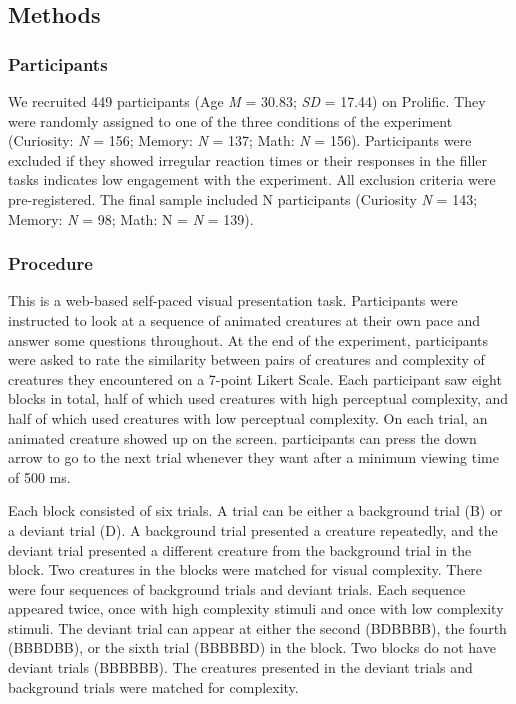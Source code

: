 \documentclass[10pt, letterpaper]{article}
\begin{document}
\hypertarget{methods}{%
\subsection{Methods}\label{methods}}

\hypertarget{participants}{%
\subsubsection{Participants}\label{participants}}

We recruited 449 participants (Age \emph{M} = 30.83; \emph{SD} = 17.44)
on Prolific. They were randomly assigned to one of the three conditions
of the experiment (Curiosity: \emph{N} = 156; Memory: \emph{N} = 137;
Math: \emph{N} = 156). Participants were excluded if they showed
irregular reaction times or their responses in the filler tasks
indicates low engagement with the experiment. All exclusion criteria
were pre-registered. The final sample included N participants (Curiosity
\emph{N} = 143; Memory: \emph{N} = 98; Math: N = \emph{N} = 139).

\hypertarget{procedure}{%
\subsubsection{Procedure}\label{procedure}}

This is a web-based self-paced visual presentation task. Participants
were instructed to look at a sequence of animated creatures at their own
pace and answer some questions throughout. At the end of the experiment,
participants were asked to rate the similarity between pairs of
creatures and complexity of creatures they encountered on a 7-point
Likert Scale. Each participant saw eight blocks in total, half of which
used creatures with high perceptual complexity, and half of which used
creatures with low perceptual complexity. On each trial, an animated
creature showed up on the screen. participants can press the down arrow
to go to the next trial whenever they want after a minimum viewing time
of 500 ms.

Each block consisted of six trials. A trial can be either a background
trial (B) or a deviant trial (D). A background trial presented a
creature repeatedly, and the deviant trial presented a different
creature from the background trial in the block. Two creatures in the
blocks were matched for visual complexity. There were four sequences of
background trials and deviant trials. Each sequence appeared twice, once
with high complexity stimuli and once with low complexity stimuli. The
deviant trial can appear at either the second (BDBBBB), the fourth
(BBBDBB), or the sixth trial (BBBBBD) in the block. Two blocks do not
have deviant trials (BBBBBB). The creatures presented in the deviant
trials and background trials were matched for complexity.
\end{document}
